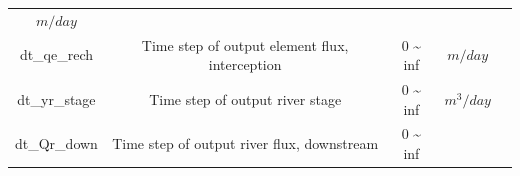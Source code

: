 \documentclass[]{scrbook}
\begin{document}
\begin{longtable}[]{@{}ccccc@{}}
\begin{minipage}[t]{0.10\columnwidth}
\(m/day\)\strut
\end{minipage} & \begin{minipage}[t]{0.26\columnwidth}\centering\strut
\strut
\end{minipage}\tabularnewline
\begin{minipage}[t]{0.17\columnwidth}\centering\strut
dt\_qe\_rech\strut
\end{minipage} & \begin{minipage}[t]{0.23\columnwidth}\centering\strut
Time step of output element flux, interception\strut
\end{minipage} & \begin{minipage}[t]{0.10\columnwidth}\centering\strut
0 \textasciitilde{} inf\strut
\end{minipage} & \begin{minipage}[t]{0.10\columnwidth}\centering\strut
\(m/day\)\strut
\end{minipage} & \begin{minipage}[t]{0.26\columnwidth}\centering\strut
\strut
\end{minipage}\tabularnewline
\begin{minipage}[t]{0.17\columnwidth}\centering\strut
dt\_yr\_stage\strut
\end{minipage} & \begin{minipage}[t]{0.23\columnwidth}\centering\strut
Time step of output river stage\strut
\end{minipage} & \begin{minipage}[t]{0.10\columnwidth}\centering\strut
0 \textasciitilde{} inf\strut
\end{minipage} & \begin{minipage}[t]{0.10\columnwidth}\centering\strut
\(m^3/day\)\strut
\end{minipage} & \begin{minipage}[t]{0.26\columnwidth}\centering\strut
\strut
\end{minipage}\tabularnewline
\begin{minipage}[t]{0.17\columnwidth}\centering\strut
dt\_Qr\_down\strut
\end{minipage} & \begin{minipage}[t]{0.23\columnwidth}\centering\strut
Time step of output river flux, downstream\strut
\end{minipage} & \begin{minipage}[t]{0.10\columnwidth}\centering\strut
0 \textasciitilde{} inf\strut
\end{minipage} & \begin{minipage}[t]{0.10\columnwidth}\centering\strut

\end{minipage}
\end{longtable}
\end{document}
